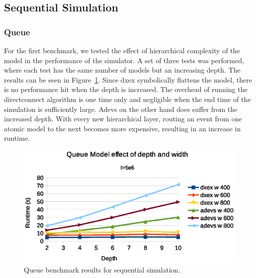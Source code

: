 \subsection{Sequential Simulation}

\subsubsection{Queue}
\label{4-seq-Queue}
For the first benchmark, we tested the effect of hierarchical complexity of the model in the performance of the simulator.
A set of three tests was performed, where each test has the same number of models but an increasing depth.
The results can be seen in Figure~\ref{fig:Queue_benchmark_seq}.
Since dxex symbolically flattens the model, there is no performance hit when the depth is increased.
The overhead of running the directconnect algorithm is one time only and negligible when the end time of the simulation is sufficiently large.
Adevs on the other hand does suffer from the increased depth.
With every new hierarchical layer, routing an event from one atomic model to the next becomes more expensive, resulting in an increase in runtime.
\begin{figure}
	\center
	\includegraphics[width=\columnwidth]{fig/queue_fixed_sequential.eps}
	\caption{Queue benchmark results for sequential simulation.}
	\label{fig:Queue_benchmark_seq}
\end{figure}

